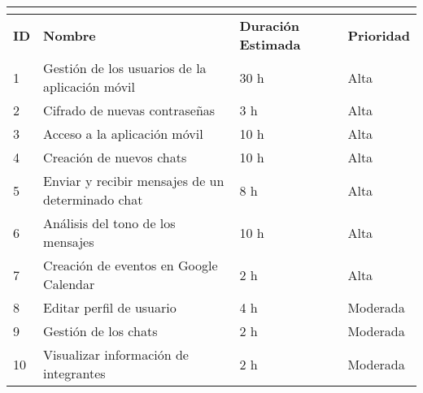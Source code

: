 \begin{tabular}{|l|l|l|l|}
	\hline
	\multicolumn{4}{|c|}{\cellcolor[HTML]{343434}{\color[HTML]{FFFFFF} \textbf{Pila de Producto}}} \\ \hline
	\textbf{ID}              & \textbf{Nombre}              & \textbf{Duración Estimada}             & \textbf{Prioridad}             \\ \hline
	1               &  Gestión de los usuarios de la aplicación móvil                   & 30 h                              & Alta                      \\ \hline
	2               & Cifrado de nuevas contraseñas                    & 3 h                               & Alta                      \\ \hline
	3               & Acceso a la aplicación móvil                    & 10 h                               & Alta                      \\ \hline
	4               & Creación de nuevos chats   & 10 h            & Alta                      \\ \hline
	5               & Enviar y recibir mensajes de un determinado chat                    & 8 h                     & Alta                      \\ \hline
	6               & Análisis del tono de los mensajes                    & 10 h                               & Alta                      \\ \hline
	7               & Creación de eventos en Google Calendar                    & 2 h                               & Alta                  \\ \hline
	8               & Editar perfil de usuario                    & 4 h                               & Moderada                      \\ \hline
	9               & Gestión de los chats                    & 2 h                               & Moderada                      \\ \hline
	10               & Visualizar información de integrantes                    & 2 h                               & Moderada                      \\ \hline
\end{tabular}